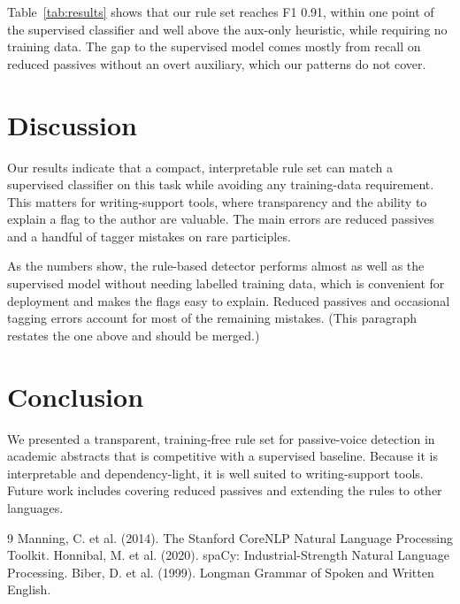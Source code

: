 \documentclass[11pt]{article}
\begin{document}
Table~\ref{tab:results} shows that our rule set reaches F1 0.91, within one point
of the supervised classifier and well above the aux-only heuristic, while
requiring no training data. The gap to the supervised model comes mostly from
recall on reduced passives without an overt auxiliary, which our patterns do not
cover.

\section{Discussion}

Our results indicate that a compact, interpretable rule set can match a
supervised classifier on this task while avoiding any training-data requirement.
This matters for writing-support tools, where transparency and the ability to
explain a flag to the author are valuable. The main errors are reduced passives
and a handful of tagger mistakes on rare participles.

As the numbers show, the rule-based detector performs almost as well as the
supervised model without needing labelled training data, which is convenient for
deployment and makes the flags easy to explain. Reduced passives and occasional
tagging errors account for most of the remaining mistakes. (This paragraph
restates the one above and should be merged.)

\section{Conclusion}

We presented a transparent, training-free rule set for passive-voice detection in
academic abstracts that is competitive with a supervised baseline. Because it is
interpretable and dependency-light, it is well suited to writing-support tools.
Future work includes covering reduced passives and extending the rules to other
languages.

\begin{thebibliography}{9}
 Manning, C. et al. (2014). The Stanford CoreNLP Natural Language Processing Toolkit.
 Honnibal, M. et al. (2020). spaCy: Industrial-Strength Natural Language Processing.
 Biber, D. et al. (1999). Longman Grammar of Spoken and Written English.
\end{thebibliography}
\end{document}
